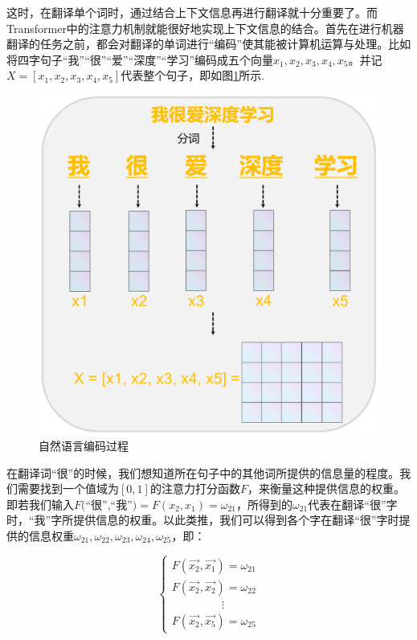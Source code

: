 这时，在翻译单个词时，通过结合上下文信息再进行翻译就十分重要了。而Transformer中的注意力机制就能很好地实现上下文信息的结合。首先在进行机器翻译的任务之前，都会对翻译的单词进行“编码”使其能被计算机运算与处理。比如将四字句子“我”“很”“爱”“深度”“学习”编码成五个向量$x_1,x_2,x_3,x_4,x_5$。并记$X=[x_1,x_2,x_3,x_4,x_5]$代表整个句子，即如图\ref{img304}所示.

\begin{figure}[h]
	\centering
	\includegraphics[width=0.4\columnwidth]{image/chap03/img304.png}
	\caption{自然语言编码过程}
	\label{img304}
\end{figure}

 在翻译词“很”的时候，我们想知道所在句子中的其他词所提供的信息量的程度。我们需要找到一个值域为$[ 0, 1]$的注意力打分函数$F$，来衡量这种提供信息的权重。即若我们输入$F($“很”,“我”$)=$$F(x_2,x_1)=\omega_{21}$，所得到的$\omega_{21}$代表在翻译“很”字时，“我”字所提供信息的权重。以此类推，我们可以得到各个字在翻译“很”字时提供的信息权重$\omega_{21},\omega_{22},\omega_{23},\omega_{24},\omega_{25}$，即：

\begin{equation} \label{301}
\left\{
\begin{array}{l}
	F(\vec{x_2},\vec{x_1})=\omega_{21}\\
	F(\vec{x_2},\vec{x_2})=\omega_{22}\\
	\qquad \qquad \ \ \vdots\\
	F(\vec{x_2},\vec{x_5})=\omega_{25}
\end{array}
\right.
\end{equation}

